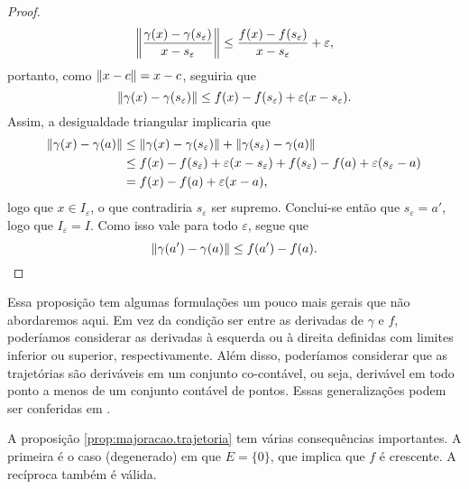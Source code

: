\begin{proof}
	\begin{equation*}
	\left\Vert{\frac{\gamma(x) - \gamma(s_\varepsilon)}{x - s_\varepsilon}}\right\Vert \leq \frac{f(x) - f(s_\varepsilon)}{x - s_\varepsilon} + \varepsilon,
	\end{equation*}
portanto, como $\left\Vert{x-c}\right\Vert = x - c$, seguiria que
	\begin{equation*}
	\left\Vert{\gamma(x) - \gamma(s_\varepsilon)}\right\Vert \leq f(x) - f(s_\varepsilon) + \varepsilon(x - s_\varepsilon).
	\end{equation*}
Assim, a desigualdade triangular implicaria que
	\begin{align*}
	\left\Vert{\gamma(x) - \gamma(a)}\right\Vert &\leq \left\Vert{\gamma(x) - \gamma(s_\varepsilon)}\right\Vert + \left\Vert{\gamma(s_\varepsilon) - \gamma(a)}\right\Vert \\
	&\leq f(x) - f(s_\varepsilon) + \varepsilon(x - s_\varepsilon) + f(s_\varepsilon) - f(a) + \varepsilon(s_\varepsilon - a) \\
	&= f(x) - f(a) + \varepsilon(x - a),
	\end{align*}
logo que $x \in I_\varepsilon$, o que contradiria $s_\varepsilon$ ser supremo. Conclui-se então que $s_\varepsilon = a'$, logo que $I_\varepsilon = I$. Como isso vale para todo $\varepsilon$, segue que
	\begin{equation*}
	\left\Vert{\gamma(a') - \gamma(a)}\right\Vert \leq f(a') - f(a).
	\qedhere
	\end{equation*}
\end{proof}

Essa proposição tem algumas formulações um pouco mais gerais que não abordaremos aqui. Em vez da condição ser entre as derivadas de $\gamma$ e $f$, poderíamos considerar as derivadas à esquerda ou à direita definidas com limites inferior ou superior, respectivamente. Além disso, poderíamos considerar que as trajetórias são deriváveis em um conjunto co-contável, ou seja, derivável em todo ponto a menos de um conjunto contável de pontos. Essas generalizações podem ser conferidas em \cite{liv:Cartan-DifferentialCalculus}.

A proposição \ref{prop:majoracao.trajetoria} tem várias consequências importantes. A primeira é o caso (degenerado) em que $E = \{0\}$, que implica que $f$ é crescente. A recíproca também é válida.

